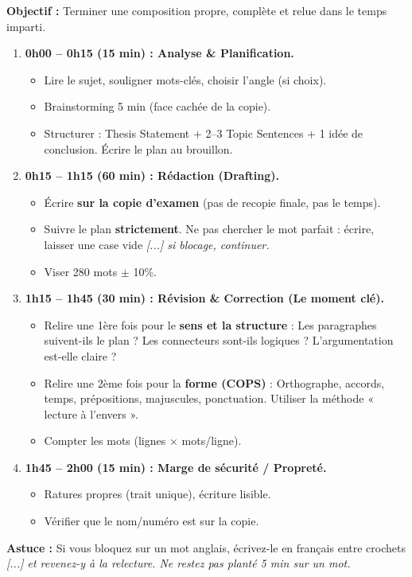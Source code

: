 \documentclass[11pt]{article}
\newcommand{\eng}[1]{\ifmmode\text{\textit{#1}}\else\begingroup\selectlanguage{english}\itshape #1\endgroup\fi}
\begin{document}
\begin{methode}
    \textbf{Objectif :} Terminer une composition propre, complète et relue dans le temps imparti.
    \begin{enumerate}
        \item \textbf{0h00 -- 0h15 (15 min) : Analyse \& Planification.}
            \begin{itemize}
                \item Lire le sujet, souligner mots-clés, choisir l'angle (si choix).
                \item Brainstorming 5 min (face cachée de la copie).
                \item Structurer : Thesis Statement + 2--3 Topic Sentences + 1 idée de conclusion. Écrire le plan au brouillon.
            \end{itemize}
        \item \textbf{0h15 -- 1h15 (60 min) : Rédaction (Drafting).}
            \begin{itemize}
                \item Écrire \textbf{sur la copie d'examen} (pas de recopie finale, pas le temps).
                \item Suivre le plan \textbf{strictement}. Ne pas chercher le mot parfait : écrire, laisser une case vide \eng{[...]} si blocage, continuer.
                \item Viser 280 mots $\pm$ 10\%.
            \end{itemize}
        \item \textbf{1h15 -- 1h45 (30 min) : Révision \& Correction (Le moment clé).}
            \begin{itemize}
                \item Relire une 1ère fois pour le \textbf{sens et la structure} : Les paragraphes suivent-ils le plan ? Les connecteurs sont-ils logiques ? L'argumentation est-elle claire ?
                \item Relire une 2ème fois pour la \textbf{forme (COPS)} : Orthographe, accords, temps, prépositions, majuscules, ponctuation. Utiliser la méthode « lecture à l'envers ».
                \item Compter les mots (lignes $\times$ mots/ligne).
            \end{itemize}
        \item \textbf{1h45 -- 2h00 (15 min) : Marge de sécurité / Propreté.}
            \begin{itemize}
                \item Ratures propres (trait unique), écriture lisible.
                \item Vérifier que le nom/numéro est sur la copie.
            \end{itemize}
    \end{enumerate}
    \textbf{Astuce :} Si vous bloquez sur un mot anglais, écrivez-le en français entre crochets \eng{[...]} et revenez-y à la relecture. Ne restez pas planté 5 min sur un mot.
\end{methode}
\end{document}
